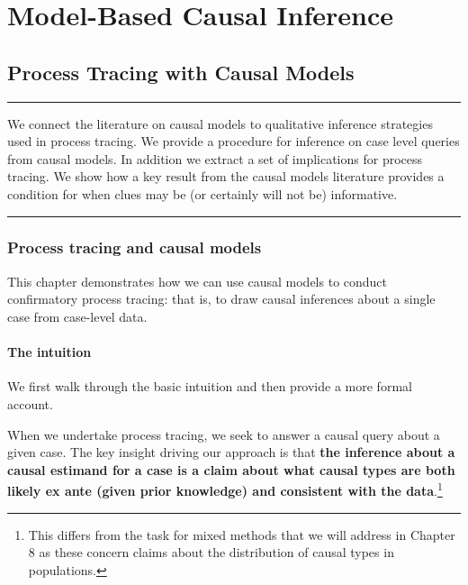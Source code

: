 \documentclass[
  12pt,
]{book}
\begin{document}
\hypertarget{part-model-based-causal-inference}{%
\part{Model-Based Causal Inference}\label{part-model-based-causal-inference}}

\hypertarget{pt}{%
\chapter{Process Tracing with Causal Models}\label{pt}}

\begin{center}\rule{0.5\linewidth}{0.5pt}\end{center}

We connect the literature on causal models to qualitative inference strategies used in process tracing. We provide a procedure for inference on case level queries from causal models. In addition we extract a set of implications for process tracing. We show how a key result from the causal models literature provides a condition for when clues may be (or certainly will not be) informative.

\begin{center}\rule{0.5\linewidth}{0.5pt}\end{center}

\hypertarget{process-tracing-and-causal-models}{%
\section{Process tracing and causal models}\label{process-tracing-and-causal-models}}

This chapter demonstrates how we can use causal models to conduct confirmatory process tracing: that is, to draw causal inferences about a single case from case-level data.

\hypertarget{the-intuition}{%
\subsection{The intuition}\label{the-intuition}}

We first walk through the basic intuition and then provide a more formal account.

When we undertake process tracing, we seek to answer a causal query about a given case.
The key insight driving our approach is that \textbf{the inference about a causal estimand for a case is a claim about what causal types are both likely ex ante (given prior knowledge) and consistent with the data}.\footnote{This differs from the task for mixed methods that we will address in Chapter 8 as these concern claims about the distribution of causal types in populations.}
\end{document}
